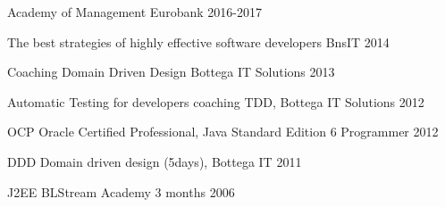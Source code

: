 
\begin{cvhonors}


  \cvhonor
    {Academy of Management} %
    {Eurobank} %
    {} %
    {2016-2017} %


  \cvhonor
    {The best strategies of highly effective software developers} %
    {BnsIT} %
    {} %
    {2014} %

  \cvhonor
    {Coaching Domain Driven Design} %
    {Bottega IT Solutions} %
    {} %
    {2013} %

  \cvhonor
    {Automatic Testing for developers} %
    {coaching TDD, Bottega IT Solutions} %
    {} %
    {2012} %

  \cvhonor
    {OCP} %
    {Oracle Certified Professional, Java Standard Edition 6 Programmer} %
    {} %
    {2012} %

  \cvhonor
    {DDD} %
    {Domain driven design (5days), Bottega IT} %
    {} %
    {2011} %

  \cvhonor
    {J2EE } %
    {BLStream Academy 3 months} %
    {} %
    {2006} %



\end{cvhonors}

